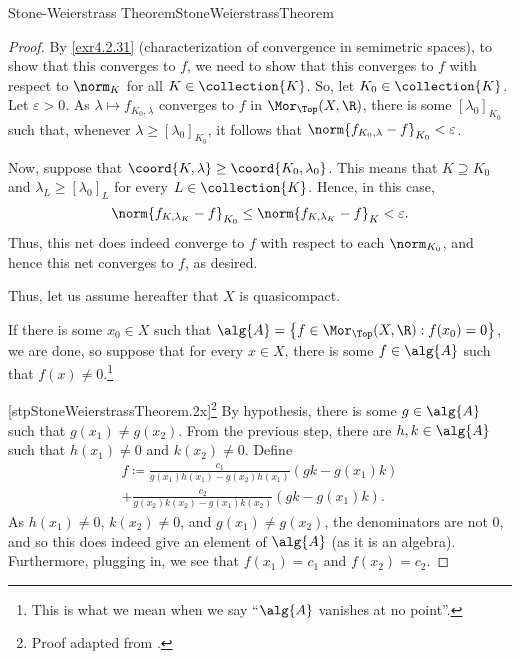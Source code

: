 \begin{thm}{Stone-Weierstrass Theorem}{StoneWeierstrassTheorem}
\begin{proof}
By \cref{exr4.2.31} (characterization of convergence in semimetric spaces), to show that this converges to $f$, we need to show that this converges to $f$ with respect to $\norm _K$ for all $K\in \collection{K}$.  So, let $K_0\in \collection{K}$.  Let $\varepsilon >0$.  As $\lambda \mapsto f_{K_0,\lambda}$ converges to $f$ in $\Mor _{\Top}(X,\R )$, there is some $[\lambda _0]_{K_0}$ such that, whenever $\lambda \geq [\lambda _0]_{K_0}$, it follows that $\norm{f_{K_0,\lambda}-f}_{K_0}<\varepsilon$.

Now, suppose that $\coord{K,\lambda}\geq \coord{K_0,\lambda _0}$.  This means that $K\supseteq K_0$ and $\lambda _L\geq [\lambda _0]_L$ for every $L\in \collection{K}$.  Hence, in this case,
\begin{equation}
\norm{f_{K,\lambda _K}-f}_{K_0}\leq \norm{f_{K,\lambda _K}-f}_K<\varepsilon .
\end{equation}
Thus, this net does indeed converge to $f$ with respect to each $\norm _{K_0}$, and hence this net converges to $f$, as desired.

Thus, let us assume hereafter that $X$ is quasicompact.

If there is some $x_0\in X$ such that $\alg{A}=\left\{ f\in \Mor _{\Top}(X,\R ):f(x_0)=0\right\}$, we are done, so suppose that for every $x\in X$, there is some $f\in \alg{A}$ such that $f(x)\neq 0$.\footnote{This is what we mean when we say ``$\alg{A}$ vanishes at no point''.}

[stpStoneWeierstrassTheorem.2x]\footnote{Proof adapted from \cite[Theorem 7.31]{Rudin}.}
By hypothesis, there is some $g\in \alg{A}$ such that $g(x_1)\neq g(x_2)$.  From the previous step, there are $h,k\in \alg{A}$ such that $h(x_1)\neq 0$ and $k(x_2)\neq 0$.  Define
\begin{equation}
\begin{multlined}
f\coloneqq \frac{c_1}{g(x_1)h(x_1)-g(x_2)h(x_1)}\left( gk-g(x_1)k\right) \\ +\frac{c_2}{g(x_2)k(x_2)-g(x_1)k(x_2)}\left( gk-g(x_1)k\right) .
\end{multlined}
\end{equation}
As $h(x_1)\neq 0$, $k(x_2)\neq 0$, and $g(x_1)\neq g(x_2)$, the denominators are not $0$, and so this does indeed give an element of $\alg{A}$ (as it is an algebra).  Furthermore, plugging in, we see that $f(x_1)=c_1$ and $f(x_2)=c_2$.


\end{proof}
\end{thm}
